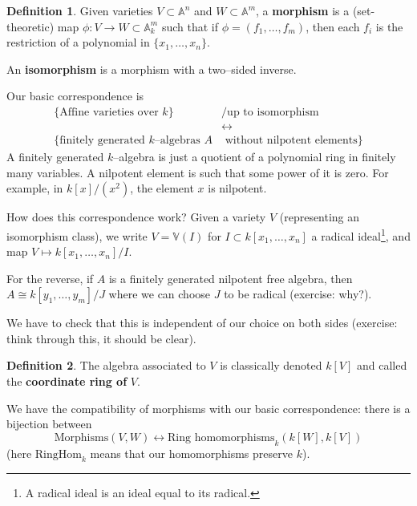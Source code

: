 \documentclass{article}
\theoremstyle{definition}
\newtheorem{defn}{Definition}[section]
\begin{document}
\begin{defn}
    Given varieties $V \subset \mathbb{A}^n$ and $W \subset  \mathbb{A}^m$, a \textbf{morphism} is a (set-theoretic) map $\phi : V \to W \subset \mathbb{A}_k^m$ such that if $\phi = (f_1,\ldots,f_m)$, then each $f_i$ is the restriction of a polynomial in $\{x_1,\ldots,x_n\}$.
    \vspace{1mm}
     
    An \textbf{isomorphism} is a morphism with a two--sided inverse.  
\end{defn}

Our basic correspondence is 
\begin{align*}
    \{\text{Affine varieties over }k\}&/\text{up to isomorphism}\\  &\leftrightarrow \\ \{\text{finitely generated }k\text{--algebras }A &\text{ without nilpotent elements}\}
\end{align*}
A finitely generated $k$--algebra is just a quotient of a polynomial ring in finitely many variables. A nilpotent element is such that some power of it is zero. For example, in $k[x]/(x^2)$, the element $x$ is nilpotent.
\vspace{1mm}
 
How does this correspondence work? Given a variety $V$ (representing an isomorphism class), we write $V = \mathbb{V}(I)$ for $I \subset k[x_1,\ldots,x_n]$ a radical ideal\footnote{A radical ideal is an ideal equal to its radical.}, and map $V \mapsto k[x_1,\ldots,x_n]/I$.
\vspace{1mm}
 
For the reverse, if $A$ is a finitely generated nilpotent free algebra, then $A \cong k[y_1,\ldots,y_m]/J$ where we can choose $J$ to be radical (exercise: why?).
\vspace{1mm}
 
We have to check that this is independent of our choice on both sides (exercise: think through this, it should be clear).

\begin{defn}
    The algebra associated to $V$ is classically denoted $k[V]$ and called the \textbf{coordinate ring of} $V$.
\end{defn}

We have the compatibility of morphisms with our basic correspondence: there is a bijection between \[
\text{Morphisms}(V, W) \leftrightarrow \text{Ring homomorphisms}_k(k[W], k[V])
\]
(here $\text{RingHom}_k$ means that our homomorphisms preserve $k$).
\end{document}
